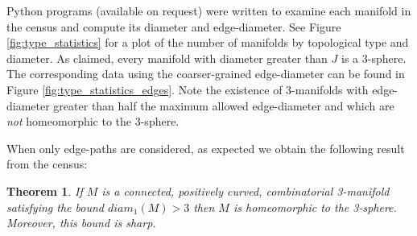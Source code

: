 \documentclass[12pt]{article}
\theoremstyle{plain}
\newtheorem{theorem}{Theorem}
\theoremstyle{definition}
\theoremstyle{remark}
\begin{document}
Python programs (available on request) were written to examine each manifold in the census and compute its diameter and edge-diameter. See Figure \ref{fig:type_statistics} for a plot of the number of manifolds by topological type and diameter. As claimed, every manifold with diameter greater than $J$ is a 3-sphere. The corresponding data using the coarser-grained edge-diameter can be found in Figure \ref{fig:type_statistics_edges}. Note the existence of $3$-manifolds with edge-diameter greater than half the maximum allowed edge-diameter and which are {\em not} homeomorphic to the 3-sphere.

When only edge-paths are considered, as expected we obtain the following result from the census:

\begin{theorem} If $M$ is a connected, positively curved, combinatorial 3-manifold satisfying the bound $diam_1(M) > 3$ then $M$ is homeomorphic to the 3-sphere. Moreover, this bound is sharp.
\end{theorem}
\end{document}
